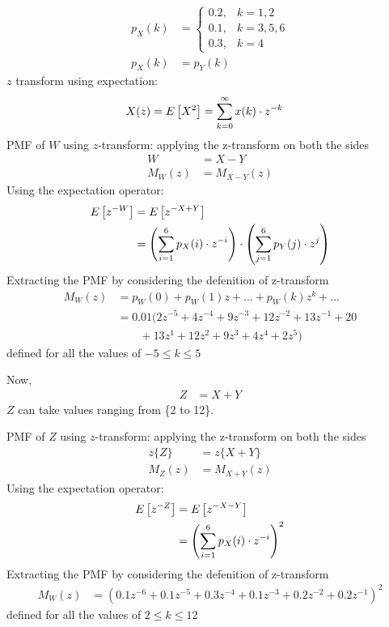 \documentclass[]{article}
\begin{document}
\begin{align}
p_X(k) &= 
	\begin{cases}
		0.2, & k = 1,2 \\
		0.1, & k = 3,5,6 \\
		0.3, & k = 4
	\end{cases}\\
	p_X(k) &= p_Y(k) 
\end{align}
$z$ transform using expectation:
\begin{align}
X(z) = E{}\left[X^2\right] &= \sum_{k=0}^{\infty}x(k)\cdot z^{-k}
\end{align}
PMF of $W$ using $z$-transform:
applying the z-transform on both the sides
\begin{align}
	W &= X-Y\\
	M_W(z) &= M_{X-Y}(z)
\end{align}
Using the expectation operator:
\begin{align}
	E{}\left[z^{-W}\right] &= E{}\left[z^{-X+Y}\right]\\
	&= \left(\sum^6_{i=1}p_X(i)\cdot z^{-i}\right)\cdot\left(\sum^6_{j=1}p_Y(j)\cdot z^{j}\right)
\end{align}
Extracting the PMF by considering the defenition of z-transform
\begin{align}
	M_W(z) &= p_W(0) +p_W(1)z + ... + p_W(k)z^k + ...\\
	&= 0.01(2z^{-5}+4z^{-4}+9z^{-3}+12z^{-2}+13z^{-1}+20\nonumber\\&\qquad+13z^{1}+12z^{2}+9z^{3}+4z^{4}+2z^{5})
\end{align}
defined for all the values of $-5 \leq k\leq 5$

Now,
\begin{align}
Z &= X+Y
\end{align}
$Z$ can take values ranging from \{2 to 12\}.

PMF of $Z$ using $z$-transform:
applying the z-transform on both the sides
\begin{align}
	z\{Z\} &= z\{X+Y\}\\
	M_Z(z) &= M_{X+Y}(z)
\end{align}
Using the expectation operator:
\begin{align}
	E{}\left[z^{-Z}\right] &= E{}\left[z^{-X-Y}\right]\\
	&= \left(\sum^6_{i=1}p_X(i)\cdot z^{-i}\right)^2
\end{align}
Extracting the PMF by considering the defenition of z-transform
\begin{align}
	M_W(z) &= (0.1z^{-6}+0.1z^{-5}+0.3z^{-4}+0.1z^{-3}+0.2z^{-2}+0.2z^{-1})^2
\end{align}
defined for all the values of $2 \leq k\leq 12$
\end{document}
